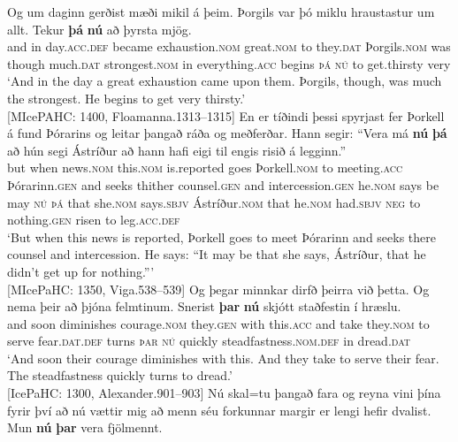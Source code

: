 \documentclass[output=paper,colorlinks,citecolor=brown]{langscibook}
\begin{document}
\ea \label{multiple-advs}
\ea \label{multiple-clash1}
\gll Og um daginn gerðist mæði mikil á þeim. Þorgils var þó miklu hraustastur um allt. Tekur \textbf{þá} \textbf{nú} að þyrsta mjög. \\
and in day.\textsc{acc.def} became  exhaustion.\textsc{nom} great.\textsc{nom} to they.\textsc{dat} Þorgils.\textsc{nom} was though much.\textsc{dat} strongest.\textsc{nom} in everything.\textsc{acc} begins \textsc{þá} \textsc{nú} to get.thirsty very\\
\glt `And in the day a great exhaustion came upon them. Þorgils, though, was much the strongest. He begins to get very thirsty.'\\ \hfill [MIcePAHC: 1400, Floamanna.1313--1315]
\ex \label{multiple-clash2} 
\gll En er tíðindi þessi spyrjast fer Þorkell á fund Þórarins og leitar þangað ráða og meðferðar. Hann segir: ``Vera má \textbf{nú} \textbf{þá} að hún segi Ástríður að hann hafi eigi til engis risið á legginn.''\\
but when news.\textsc{nom} this.\textsc{nom} is.reported goes Þorkell.\textsc{nom} to meeting.\textsc{acc} Þórarinn.\textsc{gen} and seeks thither counsel.\textsc{gen} and intercession.\textsc{gen} he.\textsc{nom} says be may \textsc{nú} \textsc{þá} that she.\textsc{nom} says.\textsc{sbjv}  Ástríður.\textsc{nom} that he.\textsc{nom} had.\textsc{sbjv}  \textsc{neg} to nothing.\textsc{gen} risen to leg.\textsc{acc.def}\\
\glt `But when this news is reported, Þorkell goes to meet Þórarinn and seeks there counsel and intercession. He says: ``It may be that she says, Ástríður, that he didn't get up for nothing.'''\\ \hfill [MIcePaHC: 1350, Viga.538--539]
\ex
\gll Og þegar minnkar dirfð þeirra við þetta. Og nema þeir að þjóna felmtinum. Snerist \textbf{þar} \textbf{nú} skjótt staðfestin í hræslu.\\
and soon diminishes courage.\textsc{nom} they.\textsc{gen} with this.\textsc{acc} and take they.\textsc{nom} to serve fear.\textsc{dat.def} turns \textsc{þar} \textsc{nú} quickly steadfastness.\textsc{nom.def} in dread.\textsc{dat}\\
\glt `And soon their courage diminishes with this. And they take to serve their fear. The steadfastness quickly turns to dread.'\\ \hfill [IcePaHC: 1300, Alexander.901--903]
\ex \label{aux-4} 
\gll Nú skal=tu þangað fara og reyna vini þína {fyrir því að} nú vættir mig að menn séu forkunnar margir er lengi hefir dvalist.
Mun \textbf{nú} \textbf{þar} vera fjölmennt.\\
\end{document}
